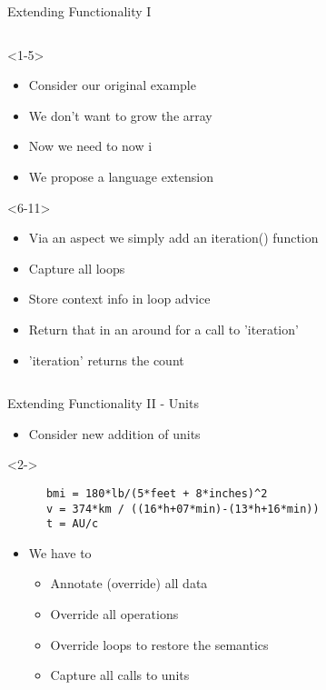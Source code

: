 \begin{frame}[fragile,t]{Extending Functionality I}
\begin{columns}[T]
      \begin{column}{5cm}
        \begin{onlyenv}<1-5>
          \begin{itemize}
          \item<1-5> Consider our original example
          \item<2-5> We don't want to grow the array
          \item<4-5> Now we need to now i
          \item<5> We propose a language extension 
          \end{itemize}
        \end{onlyenv}
        \begin{onlyenv}<6-11>
          \begin{itemize}
          \item<6-11> Via an aspect we simply add an iteration() function
          \item<7-11> Capture all loops
          \item<8-11> Store context info in loop advice 
           \item<10-11> Return that in an around for a call to 'iteration'
          \item<11> 'iteration' returns the count
          \end{itemize}
        \end{onlyenv}
    \end{column}
  \end{columns}
\end{frame}




\begin{frame}[fragile,t]{Extending Functionality II - Units}
  \begin{itemize}
  \item Consider new addition of units
  \end{itemize}
  \begin{onlyenv}<2->
    \begin{Verbatim}
      bmi = 180*lb/(5*feet + 8*inches)^2
      v = 374*km / ((16*h+07*min)-(13*h+16*min))
      t = AU/c
    \end{Verbatim}
  \end{onlyenv}
  \begin{itemize}
    \pause
    \pause \item We have to
    \begin{itemize}
      \pause \item Annotate (override) all data
      \pause \item Override all operations
      \pause \item Override loops to restore the semantics
      \pause \item Capture all calls to units
    \end{itemize}
  \end{itemize}
\end{frame}


